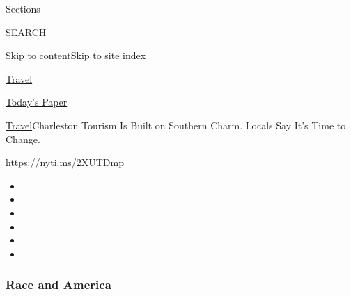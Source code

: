 Sections

SEARCH

\protect\hyperlink{site-content}{Skip to
content}\protect\hyperlink{site-index}{Skip to site index}

\href{https://www.nytimes3xbfgragh.onion/section/travel}{Travel}

\href{https://myaccount.nytimes3xbfgragh.onion/auth/login?response_type=cookie\&client_id=vi}{}

\href{https://www.nytimes3xbfgragh.onion/section/todayspaper}{Today's
Paper}

\href{/section/travel}{Travel}\textbar{}Charleston Tourism Is Built on
Southern Charm. Locals Say It's Time to Change.

\url{https://nyti.ms/2XUTDmp}

\begin{itemize}
\item
\item
\item
\item
\item
\item
\end{itemize}

\hypertarget{race-and-america}{%
\subsubsection{\texorpdfstring{\href{https://www.nytimes3xbfgragh.onion/news-event/george-floyd-protests-minneapolis-new-york-los-angeles?name=styln-george-floyd\&region=TOP_BANNER\&variant=undefined\&block=storyline_menu_recirc\&action=click\&pgtype=Article\&impression_id=c962bd50-e37d-11ea-af8a-cf9df229f915}{Race
and America}}{Race and America}}\label{race-and-america}}

